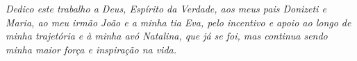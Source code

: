 \begin{dedicatoria}
	\vspace*{\fill}
	\centering
	\noindent
	\textit{Dedico este trabalho a Deus, Espírito da Verdade, aos meus pais Donizeti e Maria, ao meu irmão João e a minha tia Eva, pelo incentivo e apoio ao longo de minha trajetória e à minha avó Natalina, que já se foi, mas continua sendo minha maior força e inspiração na vida.}
    \vspace*{\fill}
\end{dedicatoria}